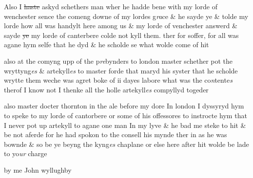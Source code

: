 \documentclass[12pt, a4paper]{book}
\begin{document}
 	
				\marginpar[\vspace{0.5cm}{\textcolor{Gray}{n}}]{}
			
 		
				\marginpar[\vspace{0.5cm}{\textcolor{Gray}{n}}]{}
			
 		
		\ifthenelse{\isodd{\thepage}}
		{\reversemarginpar}
		{\normalmarginpar}
		Also I \sout{haste} askyd
			 schethers man wher he hadde bene with my lorde of
 			wenchester sence the comeng downe of my lordes g\textit{ra}ce
			 \& he sayde ye
 			\& tolde my lorde how all was handylt here among us \& my
 				lorde of venchester answerd \& sayde \sout{ye} my lorde of canterbere
			 colde not kyll them. ther for
 soffer, for all was agane hym selfe that he dyd \& he scholde
 se what wolde come of hit
 	
		\ifthenelse{\isodd{\thepage}}
		{\reversemarginpar}
		{\normalmarginpar}
		also at the comyng upp of the p\textit{re}bynders to london master
 schether pot the wryttyng\textit{es} \& artekyll\textit{es} to master forde that
 maryd his syster that he scholde wrytte them weche was agret
 boke of ii dayes labore what was the co\textit{n}tente\textit{s} therof I know not
 I thenke all the holle artekyll\textit{es} compyllyd togeder
 	 
				\marginpar[\vspace{0.5cm}{\textcolor{Gray}{D. Thorndene}}]{}
			 
		\ifthenelse{\isodd{\thepage}}
		{\reversemarginpar}
		{\normalmarginpar}
		also master docter thornton in the ale before my dore In london
 		I dyssyryd hym to speke to my lorde of cantorbere or some of his
 offessores to instrocte hym that I never pot up artekyll to
 agane one man In my lyve \& he bad me steke to hit \& be not aferde
 for he had spokon to the consell his mynde ther in as he was
 bownde \& so be ye beyng the kyng\textit{es} chaplane or else here
 after hit wolde be lade to yo\textit{ur} charge
 	
		\ifthenelse{\isodd{\thepage}}
		{\reversemarginpar}
		{\normalmarginpar}
		by me John wyllughby

\dotfill
						\newpage {} \section*{}  \subsection*{}
\end{document}
